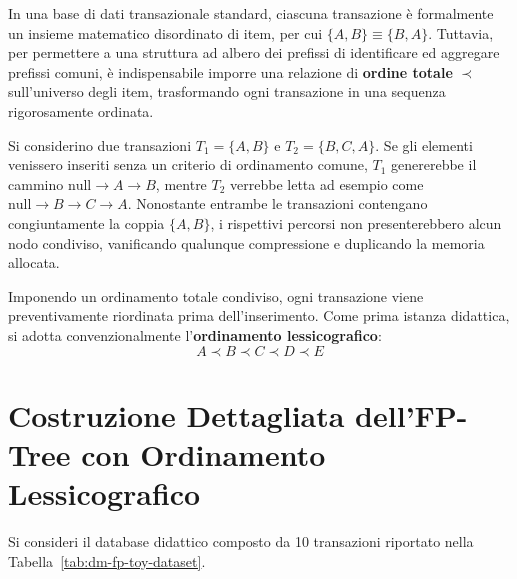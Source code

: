 In una base di dati transazionale standard, ciascuna transazione è formalmente un insieme matematico disordinato di item, per cui $\{A, B\} \equiv \{B, A\}$. Tuttavia, per permettere a una struttura ad albero dei prefissi di identificare ed aggregare prefissi comuni, è indispensabile imporre una relazione di \textbf{ordine totale} $\prec$ sull'universo degli item, trasformando ogni transazione in una sequenza rigorosamente ordinata.

\begin{example}
Si considerino due transazioni $T_1 = \{A, B\}$ e $T_2 = \{B, C, A\}$. Se gli elementi venissero inseriti senza un criterio di ordinamento comune, $T_1$ genererebbe il cammino $\text{null} \to A \to B$, mentre $T_2$ verrebbe letta ad esempio come $\text{null} \to B \to C \to A$. Nonostante entrambe le transazioni contengano congiuntamente la coppia $\{A, B\}$, i rispettivi percorsi non presenterebbero alcun nodo condiviso, vanificando qualunque compressione e duplicando la memoria allocata.
\end{example}

Imponendo un ordinamento totale condiviso, ogni transazione viene preventivamente riordinata prima dell'inserimento. Come prima istanza didattica, si adotta convenzionalmente l'\textbf{ordinamento lessicografico}:
\begin{equation}
A \prec B \prec C \prec D \prec E
\end{equation}

\FloatBarrier
\section{Costruzione Dettagliata dell'FP-Tree con Ordinamento Lessicografico}
\label{sec:dm-fp-tree-lexicographical}

Si consideri il database didattico composto da 10 transazioni riportato nella Tabella~\ref{tab:dm-fp-toy-dataset}.

